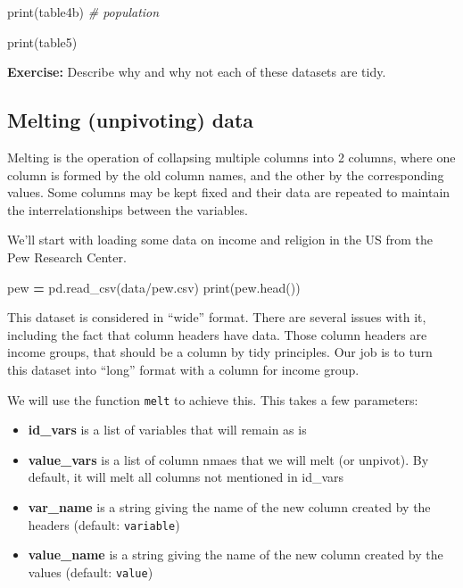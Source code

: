 \documentclass[
  letterpaper,
]{scrbook}
\newenvironment{Shaded}{\begin{snugshade}}{\end{snugshade}}
\newcommand{\BuiltInTok}[1]{#1}
\newcommand{\CommentTok}[1]{\textcolor[rgb]{0.56,0.35,0.01}{\textit{#1}}}
\newcommand{\NormalTok}[1]{#1}
\newcommand{\OperatorTok}[1]{\textcolor[rgb]{0.81,0.36,0.00}{\textbf{#1}}}
\newcommand{\StringTok}[1]{\textcolor[rgb]{0.31,0.60,0.02}{#1}}
\providecommand{\tightlist}{%
  \setlength{\itemsep}{0pt}\setlength{\parskip}{0pt}}
\begin{document}
\begin{Shaded}
\begin{Highlighting}[]
\BuiltInTok{print}\NormalTok{(table4b) }\CommentTok{\# population}
\end{Highlighting}
\end{Shaded}

\begin{Shaded}
\begin{Highlighting}[]
\BuiltInTok{print}\NormalTok{(table5)}
\end{Highlighting}
\end{Shaded}

\textbf{Exercise:} Describe why and why not each of these datasets are tidy.

\hypertarget{melting-unpivoting-data}{%
\subsection{Melting (unpivoting) data}\label{melting-unpivoting-data}}

Melting is the operation of collapsing multiple columns into 2 columns, where one column is formed by the old column names, and the other by the corresponding values. Some columns may be kept fixed and their data are repeated to maintain the interrelationships between the variables.

We'll start with loading some data on income and religion in the US from the Pew Research Center.

\begin{Shaded}
\begin{Highlighting}[]
\NormalTok{pew }\OperatorTok{=}\NormalTok{ pd.read\_csv(}\StringTok{\textquotesingle{}data/pew.csv\textquotesingle{}}\NormalTok{)}
\BuiltInTok{print}\NormalTok{(pew.head())}
\end{Highlighting}
\end{Shaded}

This dataset is considered in ``wide'' format. There are several issues with it, including the fact that column headers have data. Those column headers are income groups, that should be a column by tidy principles. Our job is to turn this dataset into ``long'' format with a column for income group.

We will use the function \texttt{melt} to achieve this. This takes a few parameters:

\begin{itemize}
\tightlist
\item
  \textbf{id\_vars} is a list of variables that will remain as is
\item
  \textbf{value\_vars} is a list of column nmaes that we will melt (or unpivot). By default, it will melt all columns not mentioned in id\_vars
\item
  \textbf{var\_name} is a string giving the name of the new column created by the headers (default: \texttt{variable})
\item
  \textbf{value\_name} is a string giving the name of the new column created by the values (default: \texttt{value})
\end{itemize}
\end{document}
